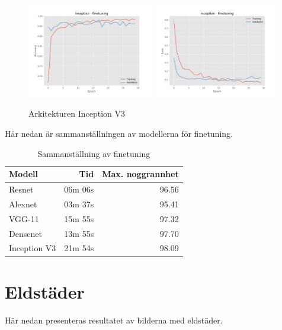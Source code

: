 \documentclass{kththesis}
\begin{document}
    \begin{figure}
      \centering
      \includegraphics[width=0.49\textwidth]{"./balcony/balcony-20split - acc - inception - finetuning"}
      \includegraphics[width=0.49\textwidth]{"./balcony/balcony-20split - loss - inception - finetuning"}
      \caption{Arkitekturen Inception V3}
    \end{figure}

    Här nedan är sammanställningen av modellerna för finetuning.

    \begin{table}
      \centering
      \begin{tabular}{|l|r|r|}
        Modell & Tid & Max. noggrannhet \\ 
        \hline
        Resnet       & 06m 06s & 96.56 \\
        Alexnet      & 03m 37s & 95.41 \\
        VGG-11       & 15m 55s & 97.32 \\
        Densenet     & 13m 55s & 97.70 \\
        Inception V3 & 21m 54s & 98.09 \\
      \end{tabular}
      \caption{Sammanställning av finetuning} \label{tab:sometab}
    \end{table}
  

  \section{Eldstäder}
  Här nedan presenteras resultatet av bilderna med eldstäder.
\end{document}
